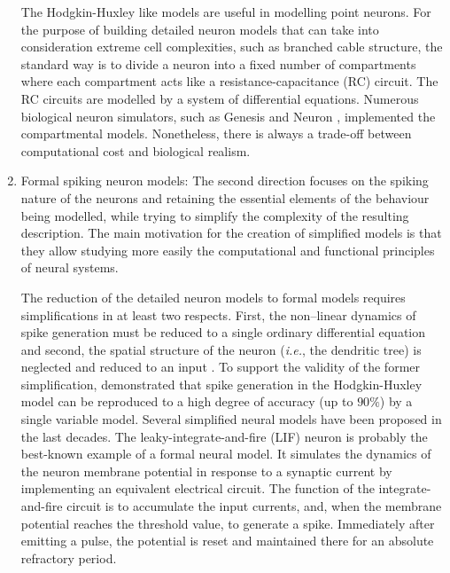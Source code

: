\begin{enumerate}
The Hodgkin-Huxley like models are useful in modelling point neurons. For the purpose of building detailed neuron models that can take into consideration extreme cell complexities, such as branched cable structure, the standard way is to divide a neuron into a fixed number of compartments where each compartment acts like a resistance-capacitance (RC) circuit. The RC circuits are modelled by a system of differential equations. Numerous biological neuron simulators, such as Genesis \citep{wilson1989genesis} and Neuron \citep{hines2006neuron}, implemented the compartmental models. Nonetheless, there is always a trade-off between computational cost and biological realism.

\item Formal spiking neuron models: The second direction focuses on the spiking nature of the neurons and retaining the essential elements of the behaviour being modelled, while trying to simplify the complexity of the resulting description. The main motivation for the creation of simplified models is that they allow studying more easily the computational and functional principles of neural systems.

The reduction of the detailed neuron models to formal models requires simplifications in at least two respects. First, the non–linear dynamics of spike generation must be reduced to a single ordinary differential equation and second, the spatial structure of the neuron (\emph{i.e.}, the dendritic tree) is neglected and reduced to an input \citep{gerstner2002spiking}. To support the validity of the former simplification, \citet{kistler1997reduction} demonstrated that spike generation in the Hodgkin-Huxley model can be reproduced to a high degree of accuracy (up to $90\%$) by a single variable model. Several simplified neural models have been proposed in the last decades. The leaky-integrate-and-fire (LIF) neuron is probably the best-known example of a formal neural model. It simulates the dynamics of the neuron membrane potential in response to a synaptic current by implementing an equivalent electrical circuit. The function of the integrate-and-fire circuit is to accumulate the input currents, and, when the membrane potential reaches the threshold value, to generate a spike. Immediately after emitting a pulse, the potential is reset and maintained there for an absolute refractory period.


\end{enumerate}
